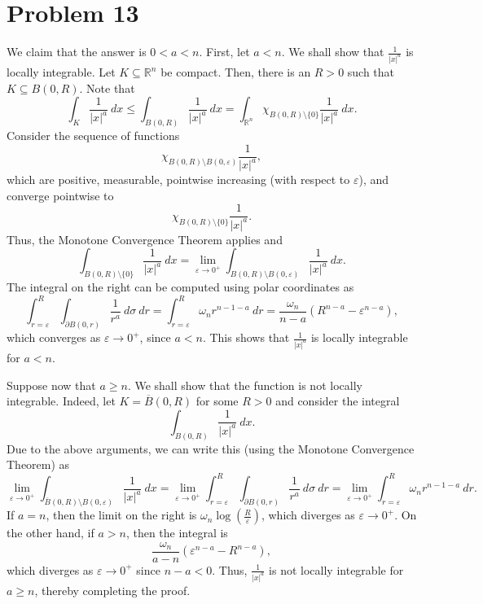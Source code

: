 \documentclass[10pt]{amsart}
\theoremstyle{thmstyle}
\theoremstyle{defstyle}
\newcommand{\R}{\mathbb{R}}
\renewcommand{\le}{\leqslant}
\renewcommand{\ge}{\geqslant}
\begin{document}
\section{Problem 13}

We claim that the answer is $0 < a < n$. First, let $a < n$. We shall show that $\frac{1}{|x|^a}$ is locally integrable. Let $K\subseteq\R^n$ be compact. Then, there is an $R > 0$ such that $K\subseteq B(0, R)$. Note that 
\begin{equation*}
	\int_K \frac{1}{|x|^a}~dx\le\int_{B(0, R)}\frac{1}{|x|^a}~dx = \int_{\R^n}\chi_{B(0, R)\setminus\{0\}}\frac{1}{|x|^a}~dx.
\end{equation*}
Consider the sequence of functions 
\begin{equation*}
	\chi_{B(0, R)\setminus B(0,\varepsilon)}\frac{1}{|x|^a},
\end{equation*}
which are positive, measurable, pointwise increasing (with respect to $\varepsilon$), and converge pointwise to 
\begin{equation*}
	\chi_{B(0, R)\setminus\{0\}}\frac{1}{|x|^a}.
\end{equation*}
Thus, the Monotone Convergence Theorem applies and 
\begin{equation*}
	\int_{B(0, R)\setminus\{0\}}\frac{1}{|x|^a}~dx = \lim_{\varepsilon\to 0^+}\int_{B(0, R)\setminus B(0,\varepsilon)}\frac{1}{|x|^a}~dx.
\end{equation*}
The integral on the right can be computed using polar coordinates as 
\begin{equation*}
	\int_{r = \varepsilon}^R \int_{\partial B(0, r)}\frac{1}{r^a}~d\sigma~dr = \int_{r = \varepsilon}^R \omega_n r^{n - 1 - a}~dr = \frac{\omega_n}{n - a}\left(R^{n - a} - \varepsilon^{n - a}\right),
\end{equation*}
which converges as $\varepsilon\to 0^+$, since $a < n$. This shows that $\frac{1}{|x|^a}$ is locally integrable for $a < n$.

Suppose now that $a\ge n$. We shall show that the function is not locally integrable. Indeed, let $K = \overline B(0, R)$ for some $R > 0$ and consider the integral 
\begin{equation*}
	\int_{B(0, R)}\frac{1}{|x|^a}~dx.
\end{equation*}
Due to the above arguments, we can write this (using the Monotone Convergence Theorem) as 
\begin{equation*}
	\lim_{\varepsilon\to 0^+}\int_{\overline B(0, R)\setminus B(0,\varepsilon)}\frac{1}{|x|^a}~dx = \lim_{\varepsilon\to 0^+}\int_{r = \varepsilon}^R \int_{\partial B(0, r)}\frac{1}{r^a}~d\sigma~dr = \lim_{\varepsilon\to 0^+}\int_{r = \varepsilon}^R\omega_n r^{n - 1 - a}~dr.
\end{equation*}
If $a = n$, then the limit on the right is $\omega_n\log\left(\frac{R}{\varepsilon}\right)$, which diverges as $\varepsilon\to 0^+$. On the other hand, if $a > n$, then the integral is 
\begin{equation*}
	\frac{\omega_n}{a - n}\left(\varepsilon^{n - a} - R^{n - a}\right),
\end{equation*}
which diverges as $\varepsilon\to 0^+$ since $n - a < 0$. Thus, $\frac{1}{|x|^a}$ is not locally integrable for $a\ge n$, thereby completing the proof.
\end{document}
